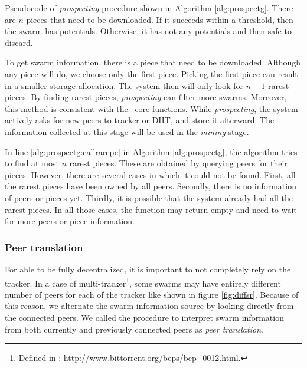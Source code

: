 Pseudocode of \textit{prospecting} procedure shown in Algorithm \ref{alg:prospectg}. There are $n$ pieces that need to be downloaded. If it succeeds within a threshold, then the swarm has potentials. Otherwise, it has not any potentials and then safe to discard. 

To get swarm information, there is a piece that need to be downloaded. Although any piece will do, we choose only the first piece. Picking the first piece can result in a smaller storage allocation. The system then will only look for $n - 1$ rarest pieces. By finding rarest pieces, \textit{prospecting} can filter more swarms. Moreover, this method is consistent with the \bt~core functions. While \textit{prospecting}, the system actively asks for new peers to tracker or DHT, and store it afterward. The information collected at this stage will be used in the \textit{mining} stage. 


In line \ref{alg:prospectg:callrarepc} in Algorithm \ref{alg:prospectg}, the algorithm tries to find  at most $n$ rarest pieces. These are obtained by querying peers for their pieces. However, there are several cases in which it could not be found. First, all the rarest pieces have been owned by all peers. Secondly, there is no information of peers or pieces yet. Thirdly, it is possible that the system already had all the rarest pieces. In all those cases, the function may return empty and need to wait for more peers or piece information.

\subsubsection{Peer translation}
For able to be fully decentralized, it is important to not completely rely on the tracker. In a case of multi-tracker\footnote{Defined in : \url{http://www.bittorrent.org/beps/bep_0012.html}.}, some swarms may have entirely different number of peers for each of the tracker like shown in figure \ref{fig:diffsr}. Because of this reason, we alternate the swarm information source by looking directly from the connected peers. We called the procedure to interpret swarm information from both currently and previously connected peers as \textit{peer translation}. 

